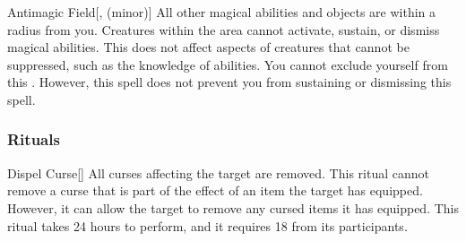 \lowercase{\hypertarget{spell:Antimagic Field}{}}\label{spell:Antimagic Field}
\begin{freeability}[Rank 8]{\hypertarget{spell:Antimagic Field}{Antimagic Field}}[,  (minor)]
All other magical abilities and objects are  within a \areamed radius  from you.
Creatures within the area cannot activate, sustain, or dismiss magical abilities.
This does not affect aspects of creatures that cannot be suppressed, such as the knowledge of abilities.
You cannot exclude yourself from this .
However, this spell does not prevent you from sustaining or dismissing this spell.

\end{freeability}
\vspace{0.25em}



\subsubsection{Rituals}


\lowercase{\hypertarget{spell:Dispel Curse}{}}\label{spell:Dispel Curse}
\begin{freeability}[Rank 3]{\hypertarget{spell:Dispel Curse}{Dispel Curse}}[]
All curses affecting the target are removed.
This ritual cannot remove a curse that is part of the effect of an item the target has equipped.
However, it can allow the target to remove any cursed items it has equipped.
This ritual takes 24 hours to perform, and it requires 18  from its participants.
\end{freeability}
\vspace{0.25em}


